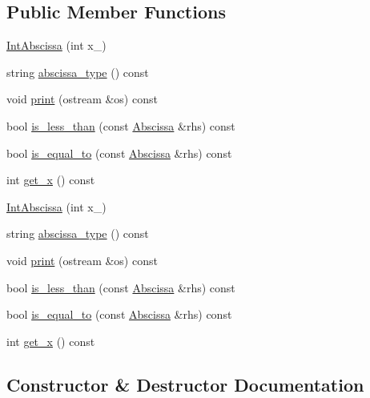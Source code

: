 \subsection*{Public Member Functions}
\begin{DoxyCompactItemize}
\item 
\mbox{\hyperlink{classIntAbscissa_a4c026235c38283134e66424a5f61cd25}{Int\+Abscissa}} (int x\+\_\+)
\item 
string \mbox{\hyperlink{classIntAbscissa_a3d21dd199d2e7623429fadce5092ac88}{abscissa\+\_\+type}} () const
\item 
void \mbox{\hyperlink{classIntAbscissa_af26b6be609db09fbe544502b6606cff8}{print}} (ostream \&os) const
\item 
bool \mbox{\hyperlink{classIntAbscissa_a8aba17c6dc640344c56cd520d6c28be2}{is\+\_\+less\+\_\+than}} (const \mbox{\hyperlink{classAbscissa}{Abscissa}} \&rhs) const
\item 
bool \mbox{\hyperlink{classIntAbscissa_a4d7663a45e6882b5d57dd59262d3900b}{is\+\_\+equal\+\_\+to}} (const \mbox{\hyperlink{classAbscissa}{Abscissa}} \&rhs) const
\item 
int \mbox{\hyperlink{classIntAbscissa_a6aea2db3e6bce733454102f2cafab3a0}{get\+\_\+x}} () const
\item 
\mbox{\hyperlink{classIntAbscissa_a4c026235c38283134e66424a5f61cd25}{Int\+Abscissa}} (int x\+\_\+)
\item 
string \mbox{\hyperlink{classIntAbscissa_a3d21dd199d2e7623429fadce5092ac88}{abscissa\+\_\+type}} () const
\item 
void \mbox{\hyperlink{classIntAbscissa_af26b6be609db09fbe544502b6606cff8}{print}} (ostream \&os) const
\item 
bool \mbox{\hyperlink{classIntAbscissa_a8aba17c6dc640344c56cd520d6c28be2}{is\+\_\+less\+\_\+than}} (const \mbox{\hyperlink{classAbscissa}{Abscissa}} \&rhs) const
\item 
bool \mbox{\hyperlink{classIntAbscissa_a4d7663a45e6882b5d57dd59262d3900b}{is\+\_\+equal\+\_\+to}} (const \mbox{\hyperlink{classAbscissa}{Abscissa}} \&rhs) const
\item 
int \mbox{\hyperlink{classIntAbscissa_a6aea2db3e6bce733454102f2cafab3a0}{get\+\_\+x}} () const
\end{DoxyCompactItemize}


\subsection{Constructor \& Destructor Documentation}
\mbox{\label{classIntAbscissa_a4c026235c38283134e66424a5f61cd25}} 

